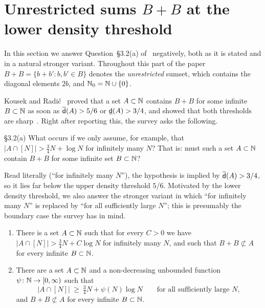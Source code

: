 %

\section{Unrestricted sums \texorpdfstring{$B+B$}{B+B} at the lower density threshold}\label{IA:sec:u32a}

In this section we answer Question~\S3.2(a) of~\cite{kra2023problems} negatively, both as it is
stated and in a natural stronger variant. Throughout this part of the paper $B+B=\{b+b':b,b'\in B\}$ denotes the
\emph{unrestricted} sumset, which contains the diagonal elements $2b$, and
$\mathbb{N}_0=\mathbb{N}\cup\{0\}$.

Kousek and Radi\'c~\cite[Theorem~1.2]{kousek2024infinite} proved that a set $A\subset\mathbb{N}$ contains
$B+B$ for some infinite $B\subset\mathbb{N}$ as soon as $\overline{\mathsf{d}}(A)>5/6$ or $\underline{\mathsf{d}}(A)>3/4$, and showed
that both thresholds are sharp~\cite[Propositions~4.1 and~4.2]{kousek2024infinite}. Right after
reporting this, the survey asks the following.

\begin{question}{\S3.2(a)}\label{IA:q:u32a}
What occurs if we only assume, for example, that $|A\cap[N]|>\tfrac34N+\log N$ for infinitely many
$N$? That is: must such a set $A\subset\mathbb{N}$ contain $B+B$ for some infinite set $B\subset\mathbb{N}$?
\end{question}

Read literally (``for infinitely many $N$''), the hypothesis is implied by $\overline{\mathsf{d}}(A)>3/4$, so it
lies far below the upper density threshold $5/6$. Motivated by the lower density threshold, we also
answer the stronger variant in which ``for infinitely many $N$'' is replaced by ``for all
sufficiently large $N$''; this is presumably the boundary case the survey has in mind.

\begin{theorem}\label{IA:thm:u32a}
\begin{enumerate}[label=\textup{(\alph*)}]
\item\label{IA:it:u32a-io} There is a set $A\subset\mathbb{N}$ such that for every $C>0$ we have
$|A\cap[N]|>\tfrac34N+C\log N$ for infinitely many $N$, and such that $B+B\not\subset A$ for every
infinite $B\subset\mathbb{N}$.
\item\label{IA:it:u32a-all} There are a set $A\subset\mathbb{N}$ and a non-decreasing unbounded function
$\psi\colon\mathbb{N}\to[0,\infty)$ such that
\[
|A\cap[N]|\ \ge\ \tfrac34N+\psi(N)\log N\qquad\text{for all sufficiently large }N,
\]
and $B+B\not\subset A$ for every infinite $B\subset\mathbb{N}$.
\end{enumerate}
\end{theorem}

